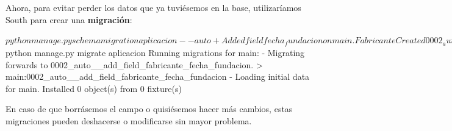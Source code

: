 Ahora, para evitar perder los datos que ya tuviésemos en la base, utilizaríamos
South para crear una \textbf{migración}:

\begin{bashcode}
$ python manage.py schemamigration aplicacion --auto  
 + Added field fecha_fundacion on main.Fabricante
Created 0002_auto__add_field_fabricante_fecha_fundacion.py. 

$ python manage.py migrate aplicacion
Running migrations for main:
 - Migrating forwards to 0002_auto__add_field_fabricante_fecha_fundacion.
 > main:0002_auto__add_field_fabricante_fecha_fundacion
 - Loading initial data for main.
Installed 0 object(s) from 0 fixture(s)
\end{bashcode}

En caso de que borrásemos el campo o quisiésemos hacer más cambios, estas
migraciones pueden deshacerse o modificarse sin mayor problema.




